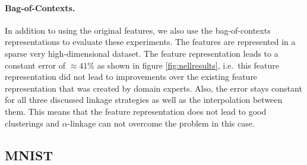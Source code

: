 \begin{table}[H]
  \caption{Proposed subcategories for ``Kitchen Item''.}
  \label{tbl:kitchenitems}
\end{table}

\paragraph{Bag-of-Contexts.} In addition to using the original features, we also use the bag-of-contexts representations to evaluate these experiments. The features are represented in a sparse very high-dimensional dataset. The feature representation leads to a constant error of $\approx 41\%$ as shown in figure \ref{fig:nellresults}, i.e.\ this feature representation did not lead to improvements over the existing feature representation that was created by domain experts. Also, the error stays constant for all three discussed linkage strategies as well as the interpolation between them. This means that the feature representation does not lead to good clusterings and $\alpha$-linkage can not overcome the problem in this case.

\subsection{MNIST}

